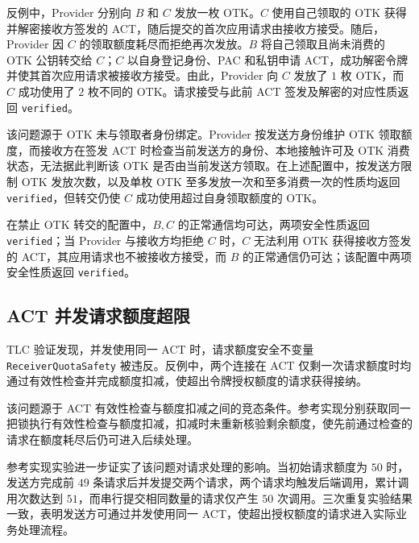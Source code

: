 反例中，Provider 分别向 $B$ 和 $C$ 发放一枚 OTK。$C$ 使用自己领取的 OTK 获得并解密接收方签发的 ACT，随后提交的首次应用请求由接收方接受。随后，Provider 因 $C$ 的领取额度耗尽而拒绝再次发放。$B$ 将自己领取且尚未消费的 OTK 公钥转交给 $C$；$C$ 以自身登记身份、PAC 和私钥申请 ACT，成功解密令牌并使其首次应用请求被接收方接受。由此，Provider 向 $C$ 发放了 $1$ 枚 OTK，而 $C$ 成功使用了 $2$ 枚不同的 OTK。请求接受与此前 ACT 签发及解密的对应性质返回 \texttt{verified}。

该问题源于 OTK 未与领取者身份绑定。Provider 按发送方身份维护 OTK 领取额度，而接收方在签发 ACT 时检查当前发送方的身份、本地接触许可及 OTK 消费状态，无法据此判断该 OTK 是否由当前发送方领取。在上述配置中，按发送方限制 OTK 发放次数，以及单枚 OTK 至多发放一次和至多消费一次的性质均返回 \texttt{verified}，但转交仍使 $C$ 成功使用超过自身领取额度的 OTK。

在禁止 OTK 转交的配置中，$B,C$ 的正常通信均可达，两项安全性质返回 \texttt{verified}；当 Provider 与接收方均拒绝 $C$ 时，$C$ 无法利用 OTK 获得接收方签发的 ACT，其应用请求也不被接收方接受，而 $B$ 的正常通信仍可达；该配置中两项安全性质返回 \texttt{verified}。

\subsection{ACT 并发请求额度超限}
\label{subsec:act-concurrent-quota}

TLC 验证发现，并发使用同一 ACT 时，请求额度安全不变量 \texttt{ReceiverQuotaSafety} 被违反。反例中，两个连接在 ACT 仅剩一次请求额度时均通过有效性检查并完成额度扣减，使超出令牌授权额度的请求获得接纳。

该问题源于 ACT 有效性检查与额度扣减之间的竞态条件。参考实现分别获取同一把锁执行有效性检查与额度扣减，扣减时未重新核验剩余额度，使先前通过检查的请求在额度耗尽后仍可进入后续处理。

参考实现实验进一步证实了该问题对请求处理的影响。当初始请求额度为 $50$ 时，发送方完成前 $49$ 条请求后并发提交两个请求，两个请求均触发后端调用，累计调用次数达到 $51$，而串行提交相同数量的请求仅产生 $50$ 次调用。三次重复实验结果一致，表明发送方可通过并发使用同一 ACT，使超出授权额度的请求进入实际业务处理流程。
